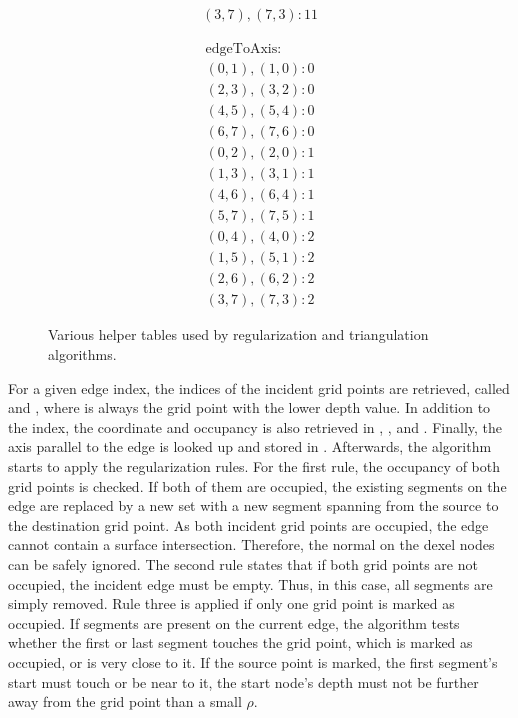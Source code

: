 \begin{figure}
\begin{subfigure}[t]{0.24\textwidth}
\begin{align*}
		(3, 7), (7, 3): 11
		\end{align*}
	\end{subfigure}
	\begin{subfigure}[t]{0.24\textwidth}
		\begin{align*}
		\text{edgeToAxis:} \\
		(0, 1), (1, 0): 0 \\
		(2, 3), (3, 2): 0 \\
		(4, 5), (5, 4): 0 \\
		(6, 7), (7, 6): 0 \\
		(0, 2), (2, 0): 1 \\
		(1, 3), (3, 1): 1 \\
		(4, 6), (6, 4): 1 \\
		(5, 7), (7, 5): 1 \\
		(0, 4), (4, 0): 2 \\
		(1, 5), (5, 1): 2 \\
		(2, 6), (6, 2): 2 \\
		(3, 7), (7, 3): 2
		\end{align*}
	\end{subfigure}
	\caption{
		Various helper tables used by regularization and triangulation algorithms.
	}
	\label{fig:tri_dexel_tables}
\end{figure}
%
For a given edge index, the indices of the incident grid points are retrieved, called  and , where  is always the grid point with the lower depth value.
In addition to the index, the coordinate and occupancy is also retrieved in , ,  and .
Finally, the axis parallel to the edge is looked up and stored in .
Afterwards, the algorithm starts to apply the regularization rules.
%
For the first rule, the occupancy of both grid points is checked.
If both of them are occupied, the existing segments on the edge are replaced by a new set with a new segment spanning from the source to the destination grid point.
As both incident grid points are occupied, the edge cannot contain a surface intersection.
Therefore, the normal on the dexel nodes can be safely ignored.
%
The second rule states that if both grid points are not occupied, the incident edge must be empty.
Thus, in this case, all segments are simply removed.
%
Rule three is applied if only one grid point is marked as occupied.
If segments are present on the current edge, the algorithm tests whether the first or last segment touches the grid point, which is marked as occupied, or is very close to it.
If the source point is marked, the first segment's start must touch or be near to it, \ie the start node's depth must not be further away from the grid point than a small $\rho$.
